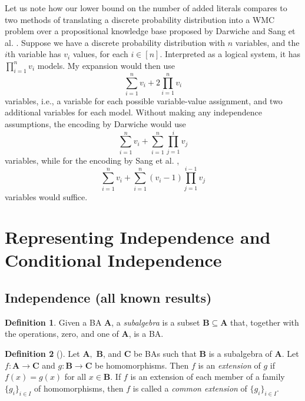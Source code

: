 \documentclass{article}
\theoremstyle{definition}
\newtheorem{definition}{Definition}
\theoremstyle{remark}
\begin{document}

Let us note how our lower bound on the number of added literals compares to two
methods of translating a discrete probability distribution into a WMC problem
over a propositional knowledge base proposed by Darwiche
\cite{DBLP:conf/kr/Darwiche02} and Sang et al. \cite{DBLP:conf/aaai/SangBK05}.
Suppose we have a discrete probability distribution with  $n$ variables, and the
$i$th variable has $v_i$ values, for each $i \in [n]$. Interpreted as a logical
system, it has $\prod_{i=1}^n v_i$ models. My expansion would then use
\[
  \sum_{i=1}^n v_i + 2\prod_{i=1}^n v_i
\]
variables, i.e., a variable for each possible variable-value assignment, and two
additional variables for each model. Without making any independence
assumptions, the encoding by Darwiche \cite{DBLP:conf/kr/Darwiche02} would use
\[
  \sum_{i=1}^n v_i + \sum_{i=1}^n \prod_{j=1}^i v_j
\]
variables, while for the encoding by Sang et al. \cite{DBLP:conf/aaai/SangBK05},
\[
  \sum_{i=1}^n v_i + \sum_{i=1}^n (v_i - 1) \prod_{j=1}^{i-1} v_j
\]
variables would suffice.


\section{Representing Independence and Conditional Independence}

\subsection{Independence (all known results)}

\begin{definition}
  Given a BA $\mathbf{A}$, a \emph{subalgebra} is a subset $\mathbf{B} \subseteq
  \mathbf{A}$ that, together with the operations, zero, and one of $\mathbf{A}$,
  is a BA.
\end{definition}

\begin{definition}[\cite{givant2008introduction}]
  Let $\mathbf{A},$ $\mathbf{B}$, and $\mathbf{C}$ be BAs such that $\mathbf{B}$
  is a subalgebra of $\mathbf{A}$. Let $f\colon \mathbf{A} \to \mathbf{C}$ and
  $g\colon \mathbf{B} \to \mathbf{C}$ be homomorphisms. Then $f$ is an
  \emph{extension} of $g$ if $f(x) = g(x)$ for all $x \in \mathbf{B}$. If $f$ is
  an extension of each member of a family $\{ g_i \}_{i \in I}$ of
  homomorphisms, then $f$ is called a \emph{common extension} of $\{ g_i \}_{i
    \in I}$.
\end{definition}
\end{document}
